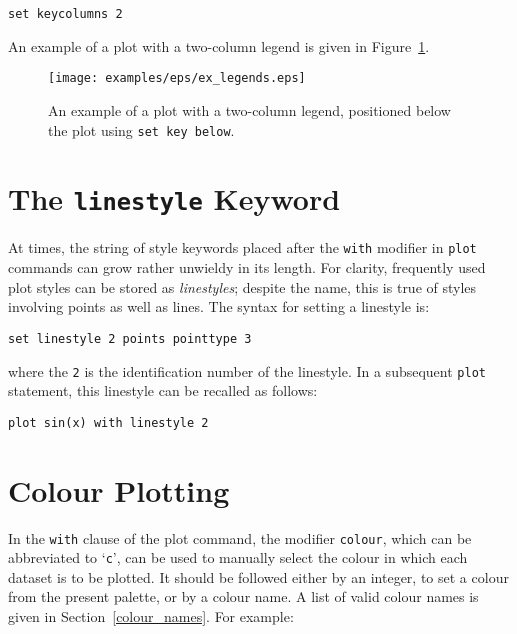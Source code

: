 \begin{verbatim}
set keycolumns 2
\end{verbatim}

\noindent An example of a plot with a two-column legend is given in
Figure~\ref{fig:ex_legends}.

\begin{figure}
\begin{center}
\texttt{[image: examples/eps/ex\_legends.eps]}
\end{center}
\caption{An example of a plot with a two-column legend, positioned below the plot using {\tt set key below}.}
\label{fig:ex_legends}
\end{figure}

\section{The {\tt linestyle} Keyword}

At times, the string of style keywords placed after the {\tt with} modifier
in {\tt plot} commands can grow rather unwieldy in its length. For clarity,
frequently used plot styles can be stored as {\it linestyles}; despite the name,
this is true of styles involving points as well as lines. The syntax for
setting a linestyle is:

\begin{verbatim}
set linestyle 2 points pointtype 3
\end{verbatim}

\noindent where the {\tt 2} is the identification number of the linestyle. In a
subsequent {\tt plot} statement, this linestyle can be recalled as follows:

\begin{verbatim}
plot sin(x) with linestyle 2
\end{verbatim}

\section{Colour Plotting}

 In the {\tt with} clause of the plot
command, the modifier {\tt colour}, which can be abbreviated to
`{\tt c}', can be used to manually select the colour in which each dataset
is to be plotted. It should be followed either by an integer, to set a colour
from the present palette, or by a colour name. A list of valid colour names is
given in Section~\ref{colour_names}. For example:

